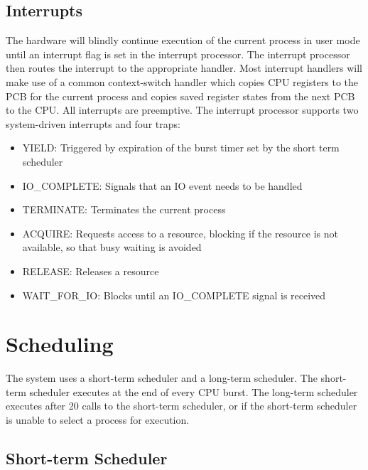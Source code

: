 \documentclass[paper=a4, fontsize=11pt]{scrartcl} %
\numberwithin{equation}{section} %
\numberwithin{figure}{section} %
\numberwithin{table}{section} %
\begin{document}
\subsection{Interrupts}

The hardware will blindly continue execution of the current process in user mode until an interrupt flag is set in the interrupt processor. The interrupt processor then routes the interrupt to the appropriate handler. Most interrupt handlers will make use of a common context-switch handler which copies CPU registers to the PCB for the current process and copies saved register states from the next PCB to the CPU. All interrupts are preemptive. The interrupt processor supports two system-driven interrupts and four traps:


\begin{itemize}
	\item YIELD: Triggered by expiration of the burst timer set by the short term scheduler
          \item IO\_COMPLETE: Signals that an IO event needs to be handled
           \item TERMINATE: Terminates the current process
	\item ACQUIRE: Requests access to a resource, blocking if the resource is not available, so that busy waiting is avoided
	\item RELEASE: Releases a resource
	\item WAIT\_FOR\_IO: Blocks until an IO\_COMPLETE signal is received
\end{itemize}

\section{Scheduling}

The system uses a short-term scheduler and a long-term scheduler. The short-term scheduler executes at the end of every CPU burst. The long-term scheduler executes after 20 calls to the short-term scheduler, or if the short-term scheduler is unable to select a process for execution.

\subsection{Short-term Scheduler}
\end{document}
